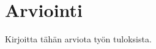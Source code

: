 \chapter{Arviointi}
\label{ch:arviointi}
\begin{it}
	Kirjoitta tähän arviota työn tuloksista.
\end{it}